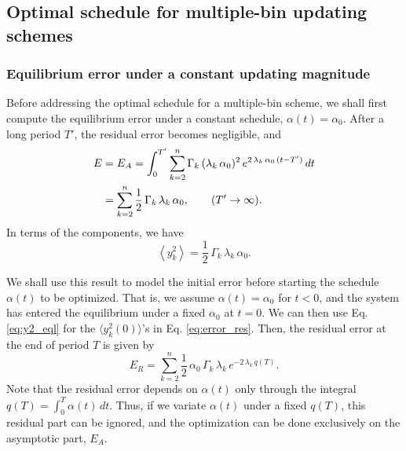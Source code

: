 \documentclass[reprint, floatfix]{revtex4-1}
\newcommand{\Err}{E}
\begin{document}
\subsection{\label{sec:mbin_opta}
Optimal schedule for multiple-bin updating schemes}



\subsubsection{\label{sec:eqlerr}
Equilibrium error under a constant updating magnitude
}


Before addressing the optimal schedule
for a multiple-bin scheme,
we shall first compute the equilibrium error
under a constant schedule,
$\alpha(t) = \alpha_0$.
%
After a long period $T'$,
the residual error becomes negligible, and
%
\begin{align}
  \Err
  &=
  \Err_A
  =
  \int_0^{T'}
    \sum_{k = 2}^n
      \Gamma_k \, (\lambda_k \, \alpha_0)^2 \,
      e^{ 2 \, \lambda_k \, \alpha_0 \, (t - T') }
    \, dt
  \notag
  \\
  &
  =
  \sum_{ k = 2 }^n
    \frac 1 2 \, \Gamma_k \, \lambda_k \, \alpha_0
  ,
  \qquad
  ( T' \to \infty )
  .
\notag
\end{align}
%
In terms of the components, we have
%
\begin{equation}
  \left\langle
    y_k^2
  \right\rangle
  =
  \frac 1 2 \, \Gamma_k \, \lambda_k \, \alpha_0.
  \label{eq:y2_eql}
\end{equation}
%


We shall use this result to model the initial error
before starting the schedule $\alpha(t)$ to be optimized.
%
That is, we assume
$\alpha(t) = \alpha_0$
for $t < 0$, and
the system has entered the equilibrium
under a fixed $\alpha_0$ at $t = 0$.
%
We can then use Eq. \eqref{eq:y2_eql}
for the $\langle y_k^2(0) \rangle$'s in Eq. \eqref{eq:error_res}.
%
Then,
the residual error at the end of period $T$
is given by
%
\begin{equation}
  \Err_R
  =
  \sum_{k = 2}^n
      \frac 1 2 \, \alpha_0 \, \Gamma_k \, \lambda_k \,
      e^{  - 2 \, \lambda_k \, q(T) }
  .
  \label{eq:error_res1}
\end{equation}
%
Note that the residual error
depends on $\alpha(t)$ only through
the integral $q(T) = \int_0^T \alpha(t) \, dt$.
%
Thus, if we variate $\alpha(t)$ under a fixed $q(T)$,
this residual part can be ignored,
and the optimization can be done exclusively
on the asymptotic part, $\Err_A$.
\end{document}

